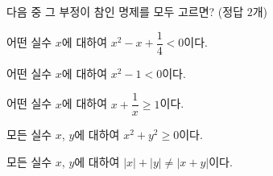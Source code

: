 다음 중 그 부정이 참인 명제를 모두 고르면? (정답 $2$개)
\begin{choicesv}{\rule[-3ex]{0pt}{8ex}어떤 실수 $x$에 대하여 $x^2-x+\dfrac{1}{4}<0$이다.}{\rule[-3ex]{0pt}{8ex}어떤 실수 $x$에 대하여 $x^2-1<0$이다.}{\rule[-3ex]{0pt}{8ex}어떤 실수 $x$에 대하여 $x+\dfrac{1}{x}\ge 1$이다.}{\rule[-3ex]{0pt}{8ex}모든 실수 $x$, $y$에 대하여 $x^2+y^2\ge 0$이다.}{\rule[-3ex]{0pt}{8ex}모든 실수 $x$, $y$에 대하여 $|x|+|y|\ne|x+y|$이다.}\end{choicesv}
